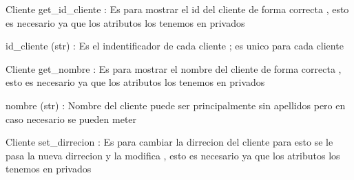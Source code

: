 \documentclass[letterpaper,10pt,spanish]{sphinxmanual}
\begin{document}
\begin{fulllineitems}
\begin{fulllineitems}
\end{fulllineitems}


\begin{fulllineitems}
\label{\detokenize{proyect:proyect.Clientes.Cliente.get_id_cliente}}
\pysigstartsignatures
{}
\pysigstopsignatures
\sphinxAtStartPar
Cliente get\_id\_cliente : Es para mostrar el id del cliente de forma correcta , esto es necesario ya que los atributos los tenemos en privados
\begin{description}
\sphinxAtStartPar
id\_cliente (str) : Es el indentificador de cada cliente ; es unico para cada cliente

\end{description}

\end{fulllineitems}


\begin{fulllineitems}
\label{\detokenize{proyect:proyect.Clientes.Cliente.get_nombre}}
\pysigstartsignatures
{}
\pysigstopsignatures
\sphinxAtStartPar
Cliente get\_nombre : Es para mostrar el nombre del cliente de forma correcta , esto es necesario ya que los atributos los tenemos en privados
\begin{description}
\sphinxAtStartPar
nombre (str) : Nombre del cliente puede ser principalmente sin apellidos pero en caso necesario se pueden meter

\end{description}

\end{fulllineitems}


\begin{fulllineitems}
\label{\detokenize{proyect:proyect.Clientes.Cliente.set_direccion}}
\pysigstartsignatures
{}
\pysigstopsignatures
\sphinxAtStartPar
Cliente set\_dirrecion : Es para cambiar la dirrecion del cliente para esto se le pasa la nueva dirrecion y la modifica , esto es necesario ya que los atributos los tenemos en privados


\end{fulllineitems}
\end{fulllineitems}
\end{document}
